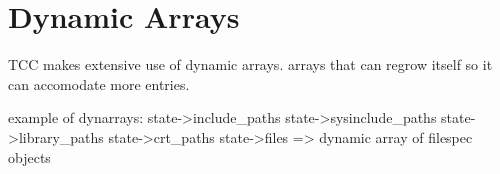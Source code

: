 \chapter{Dynamic Arrays}
TCC makes extensive use of dynamic arrays. arrays that can regrow itself 
so it can accomodate more entries.

example of dynarrays:
        state->include\_paths
        state->sysinclude\_paths
        state->library\_paths
        state->crt\_paths
        state->files => dynamic array of filespec objects

